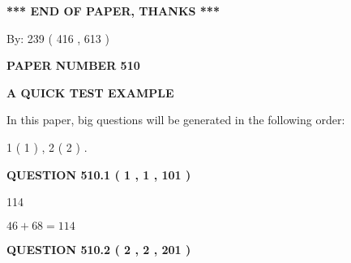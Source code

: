 \documentclass[12pt]{article}
\begin{document}
   
   
   
   
\vspace{1.0in} 
{\textbf{\large{ *** END OF PAPER, THANKS *** }}} 
   
   
\hspace{1.0in} By: 
 239 ( 416 ,  613 )
   
   
   
   
\newpage 
\setcounter{page}{ 
   510001 } 
   
   
   
   
 {\textbf{ \Large{ PAPER NUMBER  510  }}}
   
   
\vspace{0.2in}
   
   
   
   
   
   
 \vspace{0.2in}
{\LARGE {\textbf{ A QUICK TEST EXAMPLE}}}
   
   
   
\vspace{0.2in}
   
In this paper, big questions will be generated in the following order: 
   
   
   1 ( 1 )
 ,
   2 ( 2 )
 .
  
\vspace{0.2in}
  
{\textbf{\Large{QUESTION
510.1 
 ( 1 , 1 , 101 )
}}}
  
  
 
 
\noindent{}

114
 
 
 
 
\noindent{}

$ %
46 +  %
68=   %
114$
 
 
  
\vspace{0.2in}
  
{\textbf{\Large{QUESTION
510.2 
 ( 2 , 2 , 201 )
}}}
  
  
 
 
\noindent{}
 
\end{document}

